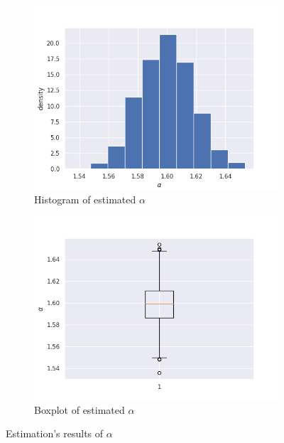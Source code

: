 \documentclass{article}
\begin{document}
	\begin{figure}
		\centering
		\begin{subfigure}[H]{0.49\textwidth}
			\centering
			\includegraphics[width=1\linewidth]{images/cf_alpha_estimation_hist}
			\caption{Histogram of estimated $\alpha$}\label{9}
		\end{subfigure}
		\hfill
		\begin{subfigure}[H]{0.49\textwidth}
			\centering
			\includegraphics[width=1\linewidth]{images/cf_alpha_estimation_boxplot}
			\caption{Boxplot of estimated $\alpha$}\label{10}
		\end{subfigure}\caption{Estimation's results of $\alpha$}
	\end{figure}
	
\end{document}
